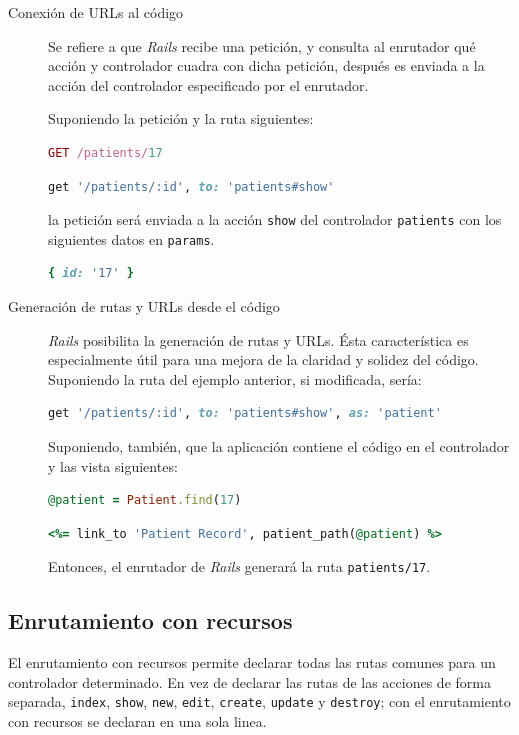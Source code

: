 \begin{description}
	\item[Conexión de URLs al código] Se refiere a que \textit{Rails} recibe una petición, y consulta al enrutador qué acción y controlador cuadra con dicha petición, después es enviada a la acción del controlador especificado por el enrutador.
	
	Suponiendo la petición y la ruta siguientes:
\begin{lstlisting}[language=Ruby]
GET /patients/17
	\end{lstlisting}
	
\begin{lstlisting}[language=Ruby]
get '/patients/:id', to: 'patients#show'	
\end{lstlisting}

	la petición será enviada a la acción \texttt{show} del controlador \texttt{patients} con los siguientes datos en \texttt{params}.
	
\begin{lstlisting}[language=Ruby]
{ id: '17' }
\end{lstlisting}

	\item[Generación de rutas y URLs desde el código] \textit{Rails} posibilita la generación de rutas y URLs. Ésta característica es especialmente útil para una mejora de la claridad y solidez del código. Suponiendo la ruta del ejemplo anterior, si modificada, sería:

\begin{lstlisting}[language=Ruby]
get '/patients/:id', to: 'patients#show', as: 'patient'
\end{lstlisting}

Suponiendo, también, que la aplicación contiene el código en el controlador y las vista siguientes:

\begin{lstlisting}[language=Ruby]
@patient = Patient.find(17)
\end{lstlisting}

\begin{lstlisting}[language=Ruby]
<%= link_to 'Patient Record', patient_path(@patient) %>
\end{lstlisting}

	Entonces, el enrutador de \textit{Rails} generará la ruta \texttt{patients/17}. 
\end{description}


\subsection{Enrutamiento con recursos}
El enrutamiento con recursos permite declarar todas las rutas comunes para un controlador determinado. En vez de declarar las rutas de las acciones de forma separada, \texttt{index}, \texttt{show}, \texttt{new}, \texttt{edit}, \texttt{create}, \texttt{update} y \texttt{destroy}; con el enrutamiento con recursos se declaran en una sola linea.

